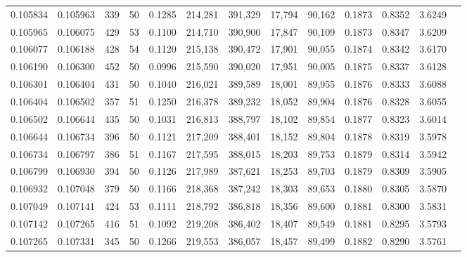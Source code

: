 \begin{tabular}{rrrrrrrrrrrrr}
0.105834 & 0.105963 &   339 &  50 &                                     0.1285 & 214,281 & 391,329 &  17,794 &  90,162 & 0.1873 & 0.8352 & 3.6249 \\
0.105965 & 0.106075 &   429 &  53 &                                     0.1100 & 214,710 & 390,900 &  17,847 &  90,109 & 0.1873 & 0.8347 & 3.6209 \\
0.106077 & 0.106188 &   428 &  54 &                                     0.1120 & 215,138 & 390,472 &  17,901 &  90,055 & 0.1874 & 0.8342 & 3.6170 \\
0.106190 & 0.106300 &   452 &  50 &                                     0.0996 & 215,590 & 390,020 &  17,951 &  90,005 & 0.1875 & 0.8337 & 3.6128 \\
0.106301 & 0.106404 &   431 &  50 &                                     0.1040 & 216,021 & 389,589 &  18,001 &  89,955 & 0.1876 & 0.8333 & 3.6088 \\
0.106404 & 0.106502 &   357 &  51 &                                     0.1250 & 216,378 & 389,232 &  18,052 &  89,904 & 0.1876 & 0.8328 & 3.6055 \\
0.106502 & 0.106644 &   435 &  50 &                                     0.1031 & 216,813 & 388,797 &  18,102 &  89,854 & 0.1877 & 0.8323 & 3.6014 \\
0.106644 & 0.106734 &   396 &  50 &                                     0.1121 & 217,209 & 388,401 &  18,152 &  89,804 & 0.1878 & 0.8319 & 3.5978 \\
0.106734 & 0.106797 &   386 &  51 &                                     0.1167 & 217,595 & 388,015 &  18,203 &  89,753 & 0.1879 & 0.8314 & 3.5942 \\
0.106799 & 0.106930 &   394 &  50 &                                     0.1126 & 217,989 & 387,621 &  18,253 &  89,703 & 0.1879 & 0.8309 & 3.5905 \\
0.106932 & 0.107048 &   379 &  50 &                                     0.1166 & 218,368 & 387,242 &  18,303 &  89,653 & 0.1880 & 0.8305 & 3.5870 \\
0.107049 & 0.107141 &   424 &  53 &                                     0.1111 & 218,792 & 386,818 &  18,356 &  89,600 & 0.1881 & 0.8300 & 3.5831 \\
0.107142 & 0.107265 &   416 &  51 &                                     0.1092 & 219,208 & 386,402 &  18,407 &  89,549 & 0.1881 & 0.8295 & 3.5793 \\
0.107265 & 0.107331 &   345 &  50 &                                     0.1266 & 219,553 & 386,057 &  18,457 &  89,499 & 0.1882 & 0.8290 & 3.5761 \\

\end{tabular}
